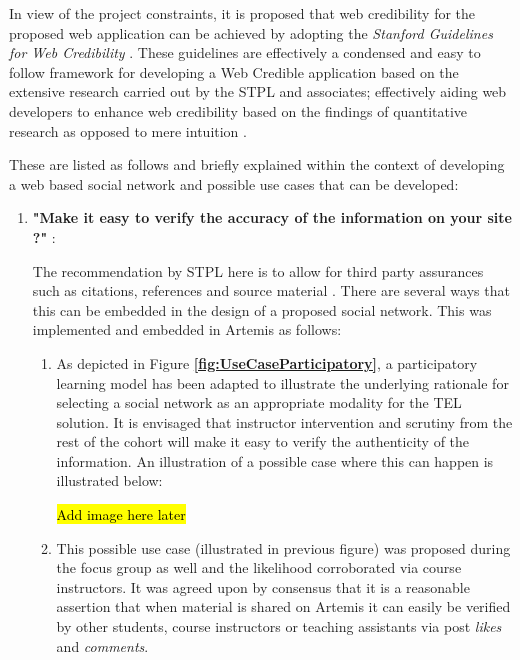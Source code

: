 In view of the project constraints, it is proposed that web credibility for the proposed web application can be achieved by adopting  the \textit{Stanford Guidelines for Web Credibility} \cite{Fogg2002a}. These guidelines are effectively a condensed and easy to follow framework for developing a Web Credible application based on the extensive research carried out by the STPL and associates; effectively aiding web developers to enhance web credibility based on the findings of quantitative research as opposed to mere intuition \cite{Fogg2002a,Fogg2002,Fogg1999}.

These are listed as follows and briefly explained within the context of developing a web based social network and possible use cases that can be developed:

\begin{enumerate}
    \item \textbf{"Make it easy to verify the accuracy of the information on your site ?"} \cite{Fogg2002a}:
    
    The recommendation by STPL here is to allow for third party assurances such as citations, references and source material \cite{Fogg2002a}. There are several ways that this can be embedded in the design of a proposed social network. This was implemented and embedded in Artemis as follows:
    \begin{enumerate}
        
        \item As depicted in Figure \textbf{\ref{fig:UseCaseParticipatory}}, a participatory learning model has been adapted to illustrate the underlying rationale for selecting a social network as an appropriate  modality for the TEL solution. It is envisaged that instructor intervention and scrutiny from the rest of the cohort will make it easy to verify the authenticity of the information. An illustration of a possible case where this can happen is illustrated below:
    
        \hl{Add image here later}
        \item This possible use case (illustrated in previous figure) was proposed during the focus group as well and the likelihood corroborated via course instructors. It was agreed upon by consensus that it is a reasonable assertion that when material is shared on Artemis it can easily be verified by other students, course instructors or teaching assistants via post \textit{likes} and \textit{comments}.
    
    \end{enumerate}
    

\end{enumerate}
